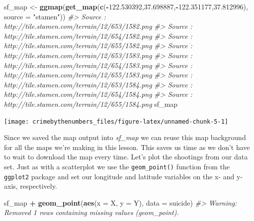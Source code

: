 \documentclass[
  12pt,
]{book}
\newenvironment{Shaded}{\begin{snugshade}}{\end{snugshade}}
\newcommand{\CommentTok}[1]{\textcolor[rgb]{0.37,0.37,0.37}{\textit{#1}}}
\newcommand{\DataTypeTok}[1]{\textcolor[rgb]{0.27,0.27,0.27}{#1}}
\newcommand{\FloatTok}[1]{\textcolor[rgb]{0.06,0.06,0.06}{#1}}
\newcommand{\KeywordTok}[1]{\textcolor[rgb]{0.27,0.27,0.27}{\textbf{#1}}}
\newcommand{\NormalTok}[1]{#1}
\newcommand{\OperatorTok}[1]{\textcolor[rgb]{0.43,0.43,0.43}{\textbf{#1}}}
\newcommand{\StringTok}[1]{\textcolor[rgb]{0.5,0.5,0.5}{#1}}
\begin{document}
\begin{Shaded}
\begin{Highlighting}[]
\NormalTok{sf\_map <{-}}\StringTok{ }\KeywordTok{ggmap}\NormalTok{(}\KeywordTok{get\_map}\NormalTok{(}\KeywordTok{c}\NormalTok{(}\OperatorTok{{-}}\FloatTok{122.530392}\NormalTok{,}\FloatTok{37.698887}\NormalTok{,}\OperatorTok{{-}}\FloatTok{122.351177}\NormalTok{,}\FloatTok{37.812996}\NormalTok{), }
                            \DataTypeTok{source =} \StringTok{"stamen"}\NormalTok{))}
\CommentTok{\#> Source : http://tile.stamen.com/terrain/12/653/1582.png}
\CommentTok{\#> Source : http://tile.stamen.com/terrain/12/654/1582.png}
\CommentTok{\#> Source : http://tile.stamen.com/terrain/12/655/1582.png}
\CommentTok{\#> Source : http://tile.stamen.com/terrain/12/653/1583.png}
\CommentTok{\#> Source : http://tile.stamen.com/terrain/12/654/1583.png}
\CommentTok{\#> Source : http://tile.stamen.com/terrain/12/655/1583.png}
\CommentTok{\#> Source : http://tile.stamen.com/terrain/12/653/1584.png}
\CommentTok{\#> Source : http://tile.stamen.com/terrain/12/654/1584.png}
\CommentTok{\#> Source : http://tile.stamen.com/terrain/12/655/1584.png}
\NormalTok{sf\_map}
\end{Highlighting}
\end{Shaded}

\begin{center}\texttt{[image: crimebythenumbers\_files/figure-latex/unnamed-chunk-5-1]} \end{center}

Since we saved the map output into \emph{sf\_map} we can reuse this map background for all the maps we're making in this lesson. This saves us time as we don't have to wait to download the map every time. Let's plot the shootings from our data set. Just as with a scatterplot we use the \texttt{geom\_point()} function from the \texttt{ggplot2} package and set our longitude and latitude variables on the x- and y-axis, respectively.

\begin{Shaded}
\begin{Highlighting}[]
\NormalTok{sf\_map }\OperatorTok{+}
\StringTok{  }\KeywordTok{geom\_point}\NormalTok{(}\KeywordTok{aes}\NormalTok{(}\DataTypeTok{x =}\NormalTok{ X, }\DataTypeTok{y =}\NormalTok{ Y),}
             \DataTypeTok{data  =}\NormalTok{ suicide)}
\CommentTok{\#> Warning: Removed 1 rows containing missing values (geom\_point).}
\end{Highlighting}
\end{Shaded}
\end{document}
